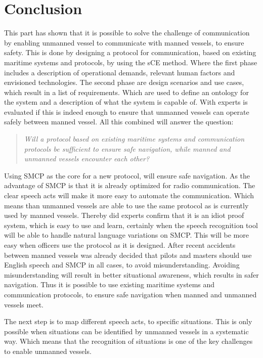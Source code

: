 \chapter{Conclusion}
This part has shown that it is possible to solve the challenge of communication by enabling unmanned vessel to communicate with manned vessels, to ensure safety. This is done by designing a protocol for communication, based on existing maritime systems and protocols, by using the \acf{sCE} method. Where the first phase includes a description of operational demands, relevant human factors and envisioned technologies. The second phase are design scenarios and use cases, which result in a list of requirements. Which are used to define an ontology for the system and a description of what the system is capable of. With experts is evaluated if this is indeed enough to ensure that unmanned vessels can operate safely between manned vessel. All this combined will answer the question:

\begin{quotation}
	\emph{Will a protocol based on existing maritime systems and communication protocols be sufficient to ensure safe navigation, while manned and unmanned vessels encounter each other?}
\end{quotation}

Using \acf{SMCP} as the core for a new protocol, will ensure safe navigation. As the advantage of \ac{SMCP} is that it is already optimized for radio communication. The clear speech acts will make it more easy to automate the communication. Which means than unmanned vessels are able to use the same protocol as is currently used by manned vessels. Thereby did experts confirm that it is an idiot proof system, which is easy to use and learn, certainly when the speech recognition tool will be able to handle natural language variations on \ac{SMCP}.
This will be more easy when officers use the protocol as it is designed. After recent accidents between manned vessels was already decided that pilots and masters should use English speech and \ac{SMCP} in all cases, to avoid misunderstanding. Avoiding misunderstanding will result in better situational awareness, which results in safer navigation.
Thus it is possible to use existing maritime systems and communication protocols, to ensure safe navigation when manned and unmanned vessels meet.

The next step is to map different speech acts, to specific situations. This is only possible when situations can be identified by unmanned vessels in a systematic way. Which means that the recognition of situations is one of the key challenges to enable unmanned vessels. 